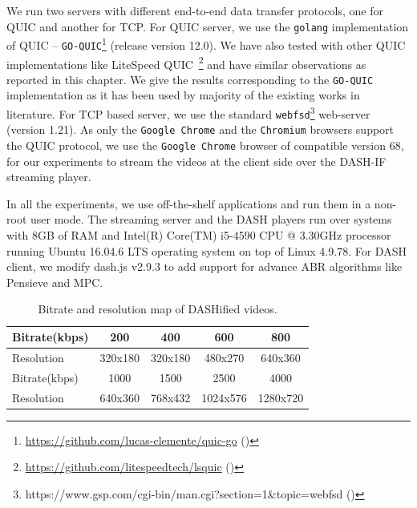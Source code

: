 We run two servers with different end-to-end data transfer protocols, one for \ac{QUIC} and another for \ac{TCP}. For \ac{QUIC} server, we use the {\tt golang} implementation of \ac{QUIC} -- \texttt{GO-QUIC}\footnote{\url{https://github.com/lucas-clemente/quic-go} (\lastaccessedtoday)} (release version 12.0). We have also tested with other \ac{QUIC} implementations like LiteSpeed \ac{QUIC}~\footnote{\url{https://github.com/litespeedtech/lsquic} (\lastaccessedtoday)} and have similar observations as reported in this chapter. We give the results corresponding to the \texttt{GO-QUIC} implementation as it has been used by majority of the existing works in literature. For TCP based server, we use the standard {\tt webfsd}\footnote{https://www.gsp.com/cgi-bin/man.cgi?section=1\&topic=webfsd (\lastaccessedtoday)} web-server (version 1.21). As only the {\tt Google Chrome} and the {\tt Chromium} browsers support the \ac{QUIC} protocol, we use the {\tt Google Chrome} browser of compatible version 68, for our experiments to stream the videos at the client side over the \ac{DASH-IF} streaming player.


In all the experiments, we use off-the-shelf applications and run them in a non-root user mode. The streaming server and the \ac{DASH} players run over systems with 8GB of RAM and Intel(R) Core(TM) i5-4590 CPU @ 3.30GHz processor running Ubuntu 16.04.6 LTS operating system on top of Linux 4.9.78. For \ac{DASH} client, we modify dash.js v2.9.3 to add support for advance \ac{ABR} algorithms like Pensieve and MPC.


\begin{table}[h]
     \caption{\label{table:chap03s2:bitrate}Bitrate and resolution map of DASHified videos.}
	\centering
	\begin{tabular}{|l|c|c|c|c|}
		\hline
		Bitrate(kbps) & 200 & 400 & 600 & 800 \\ \hline
		Resolution & 320x180 & 320x180 & 480x270 & 640x360 \\ \hline \hline
		Bitrate(kbps) & 1000 & 1500 & 2500 & 4000 \\ \hline
		Resolution & 640x360 & 768x432 & 1024x576 & 1280x720 \\ \hline
	\end{tabular}
\end{table}

